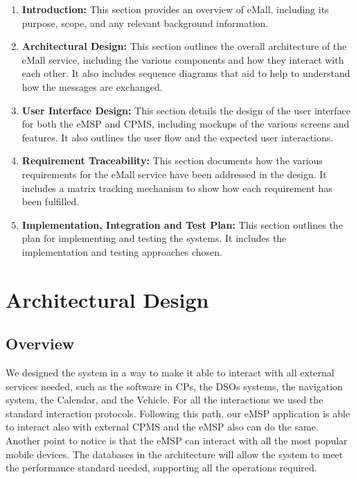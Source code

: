 \documentclass{Configuration_Files/PoliMi3i_thesis}
\begin{document}
\begin{enumerate}
    \item \textbf{Introduction:} This section provides an overview of eMall, including its purpose, scope, and any relevant background information.
    \item \textbf{Architectural Design:} This section outlines the overall architecture of the eMall service, including the various components and how they interact with each other. It also includes sequence diagrams that aid to help to understand how the messages are exchanged.
    \item \textbf{User Interface Design:} This section details the design of the user interface for both the eMSP and CPMS, including mockups of the various screens and features. It also outlines the user flow and the expected user interactions.
    \item \textbf{Requirement Traceability:} This section documents how the various requirements for the eMall service have been addressed in the design. It includes a matrix tracking mechanism to show how each requirement has been fulfilled.
    \item \textbf{Implementation, Integration and Test Plan:} This section outlines the plan for implementing and testing the systems. It includes the implementation and testing approaches chosen.
\end{enumerate}

\chapter{Architectural Design}

\section{Overview}

We designed the system in a way to make it able to interact with all external services needed, such as the software in CPs, the DSOs systems, the navigation system, the Calendar, and the Vehicle.
For all the interactions we used the standard interaction protocols. 
Following this path, our eMSP application is able to interact also with external CPMS and the eMSP also can do the same. 
Another point to notice is that the eMSP can interact with all the most popular mobile devices.
The databases in the architecture will allow the system to meet the performance standard needed, supporting all the operations required.
 
\end{document}
